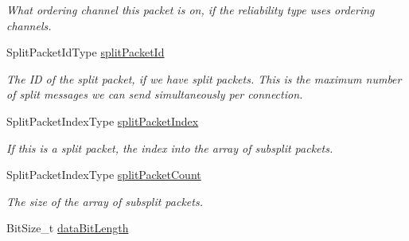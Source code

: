 \begin{DoxyCompactItemize}
\begin{DoxyCompactList}\small\item\em What ordering channel this packet is on, if the reliability type uses ordering channels. \end{DoxyCompactList}\item 
\hypertarget{struct_rak_net_1_1_internal_packet_fixed_size_transmission_header_a9ff04fd4ec549f0bd52eb665a81a7c44}{Split\-Packet\-Id\-Type \hyperlink{struct_rak_net_1_1_internal_packet_fixed_size_transmission_header_a9ff04fd4ec549f0bd52eb665a81a7c44}{split\-Packet\-Id}}\label{struct_rak_net_1_1_internal_packet_fixed_size_transmission_header_a9ff04fd4ec549f0bd52eb665a81a7c44}

\begin{DoxyCompactList}\small\item\em The I\-D of the split packet, if we have split packets. This is the maximum number of split messages we can send simultaneously per connection. \end{DoxyCompactList}\item 
\hypertarget{struct_rak_net_1_1_internal_packet_fixed_size_transmission_header_a84b8347e3c3e9cdcb6b275686b3cb910}{Split\-Packet\-Index\-Type \hyperlink{struct_rak_net_1_1_internal_packet_fixed_size_transmission_header_a84b8347e3c3e9cdcb6b275686b3cb910}{split\-Packet\-Index}}\label{struct_rak_net_1_1_internal_packet_fixed_size_transmission_header_a84b8347e3c3e9cdcb6b275686b3cb910}

\begin{DoxyCompactList}\small\item\em If this is a split packet, the index into the array of subsplit packets. \end{DoxyCompactList}\item 
\hypertarget{struct_rak_net_1_1_internal_packet_fixed_size_transmission_header_ac1836c3dbf2c34ef838326b321fef7e2}{Split\-Packet\-Index\-Type \hyperlink{struct_rak_net_1_1_internal_packet_fixed_size_transmission_header_ac1836c3dbf2c34ef838326b321fef7e2}{split\-Packet\-Count}}\label{struct_rak_net_1_1_internal_packet_fixed_size_transmission_header_ac1836c3dbf2c34ef838326b321fef7e2}

\begin{DoxyCompactList}\small\item\em The size of the array of subsplit packets. \end{DoxyCompactList}\item 
\hypertarget{struct_rak_net_1_1_internal_packet_fixed_size_transmission_header_af919cecb3bd4ff255701f0a3b3cd827a}{Bit\-Size\-\_\-t \hyperlink{struct_rak_net_1_1_internal_packet_fixed_size_transmission_header_af919cecb3bd4ff255701f0a3b3cd827a}{data\-Bit\-Length}}\label{struct_rak_net_1_1_internal_packet_fixed_size_transmission_header_af919cecb3bd4ff255701f0a3b3cd827a}


\end{DoxyCompactItemize}
